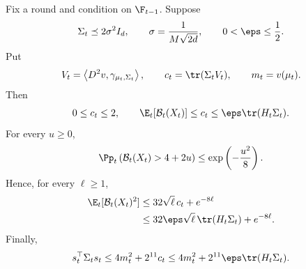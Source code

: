 \begin{lemma}
    \label{lem:ctr-B-moments}
    Fix a round and condition on $\F_{t-1}$.  Suppose
    \begin{align}
        \Sigma_t\preceq2\sigma^2I_d,
        \qquad
        \sigma=\frac1{M\sqrt{2d}},
        \qquad
        0<\eps\leq\frac12.
        \label{eq:ctr-B-cov-assumption}
    \end{align}
    Put
    \begin{align}
        V_t=\left\langle D^2v,\gamma_{\mu_t,\Sigma_t}\right\rangle,
        \qquad
        c_t=\tr(\Sigma_tV_t),
        \qquad
        m_t=v(\mu_t).
    \end{align}
    Then
    \begin{align}
        0\leq c_t\leq2,
        \qquad
        \E_t[\mathcal B_t(X_t)]\leq c_t
        \leq\eps\tr(H_t\Sigma_t).
        \label{eq:ctr-B-first}
    \end{align}
    For every $u\geq0$,
    \begin{align}
        \Pp_t\left(\mathcal B_t(X_t)>4+2u\right)
        \leq\exp\left(-\frac{u^2}{8}\right).
        \label{eq:ctr-B-tail}
    \end{align}
    Hence, for every $\ell\geq1$,
    \begin{align}
        \E_t[\mathcal B_t(X_t)^2]
         & \leq32\sqrt\ell\,c_t+e^{-8\ell}
        \label{eq:ctr-B-second-a}
        \\
         & \leq32\eps\sqrt\ell\,\tr(H_t\Sigma_t)+e^{-8\ell}.
        \label{eq:ctr-B-second-b}
    \end{align}
    Finally,
    \begin{align}
        s_t^\top\Sigma_ts_t
        \leq4m_t^2+2^{11}c_t
        \leq4m_t^2+2^{11}\eps\tr(H_t\Sigma_t).
        \label{eq:ctr-normal-width}
    \end{align}
\end{lemma}

